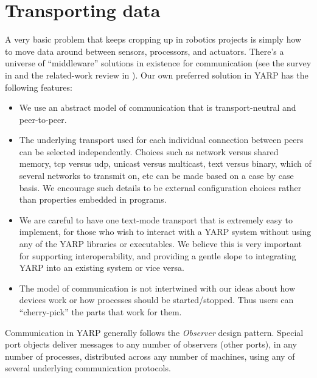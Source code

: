 
\setlength{\doublerulesep}{\arrayrulewidth}



\section{Transporting data}
\label{sec:transporting}

A very basic problem that keeps cropping up in robotics projects is
simply how to move data around between sensors, processors,
and actuators.  There's a universe of ``middleware'' solutions
in existence for communication (see the survey in \cite{kramer2007development}
and the related-work review in \cite{collett2005player}).
%
%
%
Our own preferred solution
in YARP has the following features:

\begin{itemize} \pflist

\item We use an abstract model of communication that is
transport-neutral and peer-to-peer.

\item The underlying transport used for each individual connection
between peers can be selected independently.  Choices such as network
versus shared memory, tcp versus udp, unicast versus multicast, text
versus binary, which of several networks to transmit on, etc can be
made based on a case by case basis.  We encourage such details to be
external configuration choices rather than properties embedded in
programs.

\item We are careful to have one text-mode transport that is
extremely easy to implement, for those who wish to interact with a
YARP system without using any of the YARP libraries or executables.
We believe this is very important for supporting interoperability, and
providing a gentle slope to integrating YARP into an existing system
or vice versa.

\item The model of communication is not intertwined with our
ideas about how devices work or how processes should be started/stopped.
Thus users can ``cherry-pick'' the parts that work for them.

\end{itemize}

Communication in YARP generally follows the {\it Observer} design
pattern. Special port objects deliver messages to any number of
observers (other ports), in any number of processes, distributed
across any number of machines, using any of several underlying
communication protocols. 





